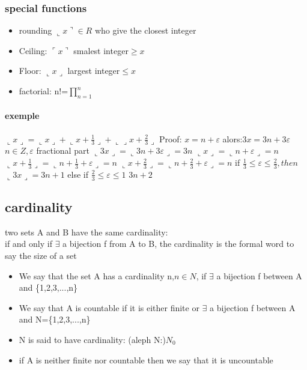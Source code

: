 \documentclass[a4paper,10pt]{article}
\begin{document}
{\subsubsection{special functions}
\begin{itemize}
 \item rounding $\llcorner x\urcorner \in R$ who give the closest integer
 \item Ceiling: $\ulcorner x\urcorner$ smalest integer$ \geq x$
 \item Floor: $\llcorner x\lrcorner$ largest integer$\leq x$
 \item factorial: n!=$\prod^n_{n=1}$
\end{itemize}
\paragraph{exemple}
$\llcorner x\lrcorner=\llcorner x\lrcorner+\llcorner x+\frac{1}{3}\lrcorner+\llcorner\lrcorner x+\frac{2}{3}\lrcorner$
\newline
Proof:
\newline
$x=n+\varepsilon$ alors:$3x=3n+3\varepsilon$ $n\in Z,\varepsilon$ fractional part
\newline
$\llcorner 3x\lrcorner=\llcorner3n+3\varepsilon\lrcorner=3n$
\newline
$\llcorner x\lrcorner=\llcorner n+\varepsilon\lrcorner=n$
\newline
$\llcorner x+\frac{1}{3}\lrcorner=\llcorner n+\frac{1}{3}+\varepsilon\lrcorner=n$
\newline
$\llcorner x+\frac{2}{3}\lrcorner=\llcorner n+\frac{2}{3}+\varepsilon\lrcorner=n$
\newline
if $\frac{1}{3}\leq\varepsilon\leq\frac{2}{3},then$ $\llcorner 3x\lrcorner=3n+1$
\newline
else if $\frac{2}{3}\leq \varepsilon \leq 1$ $3n+2$
\subsection{cardinality}
\begin{description}
 \item two sets A and B have the same cardinality:\\{if and only if $\exists$ a bijection f from A to B, the cardinality is the formal word to say the size of a set}
 \end{description}

\begin{itemize}
 \item We say that the set A has a cardinality n,$n\in N$, if $\exists$ a bijection f between A and \{1,2,3,...,n\}
 \item We say that A is countable if it is either finite or $\exists$ a bijection f between A and N=\{1,2,3,...,n\}
 \item N is said to have cardinality: (aleph N:)$N_0$
 \item if A is neither finite nor countable then we say that it is uncountable
\end{itemize}
}
\end{document}
